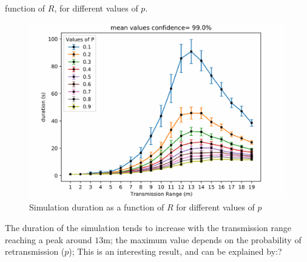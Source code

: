 function of $R$, for different values of $p$.
\begin{figure}[H]
    \begin{center}
        \includegraphics[scale=.7]{img/Big_DurRange_mean.pdf}
    \end{center}
    \vspace*{-0.5cm}
    \caption{Simulation duration as a function of $R$ for different values of $p$}
    \label{fig:floorplancoverage4}
\end{figure}
\noindent
The duration of the simulation tends to increase with the transmission range
reaching a peak around $13$m; the maximum value depends on the probability of
retransmission ($p$);
This is an interesting result, and can be explained by:?%
